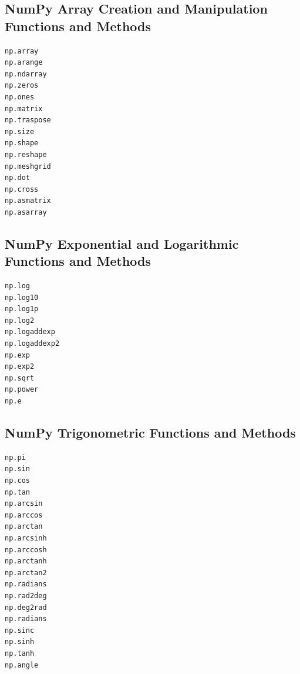 \documentclass{book}
\newenvironment{key_terms}{\begin{multicols}{3}}{\end{multicols}} %
\begin{document}
    
        \subsection{NumPy Array Creation and Manipulation Functions and
Methods}\label{numpy-array-creation-and-manipulation-functions-and-methods}
    




    
        \begin{key_terms}
        \begin{lstlisting}
np.array
np.arange
np.ndarray
np.zeros
np.ones
np.matrix
np.traspose
np.size
np.shape
np.reshape
np.meshgrid
np.dot
np.cross
np.asmatrix
np.asarray
\end{lstlisting}
        \end{key_terms}

    




    
        \subsection{NumPy Exponential and Logarithmic Functions and
Methods}\label{numpy-exponential-and-logarithmic-functions-and-methods}
    




    
        \begin{key_terms}
        \begin{lstlisting}
np.log
np.log10
np.log1p
np.log2
np.logaddexp
np.logaddexp2
np.exp
np.exp2
np.sqrt
np.power
np.e
\end{lstlisting}
        \end{key_terms}

    




    
        \subsection{NumPy Trigonometric Functions and
Methods}\label{numpy-trigonometric-functions-and-methods}
    




    
        \begin{key_terms}
        \begin{lstlisting}
np.pi
np.sin
np.cos
np.tan
np.arcsin
np.arccos
np.arctan
np.arcsinh
np.arccosh
np.arctanh
np.arctan2
np.radians
np.rad2deg
np.deg2rad
np.radians
np.sinc
np.sinh
np.tanh
np.angle
\end{lstlisting}
        \end{key_terms}
\end{document}
